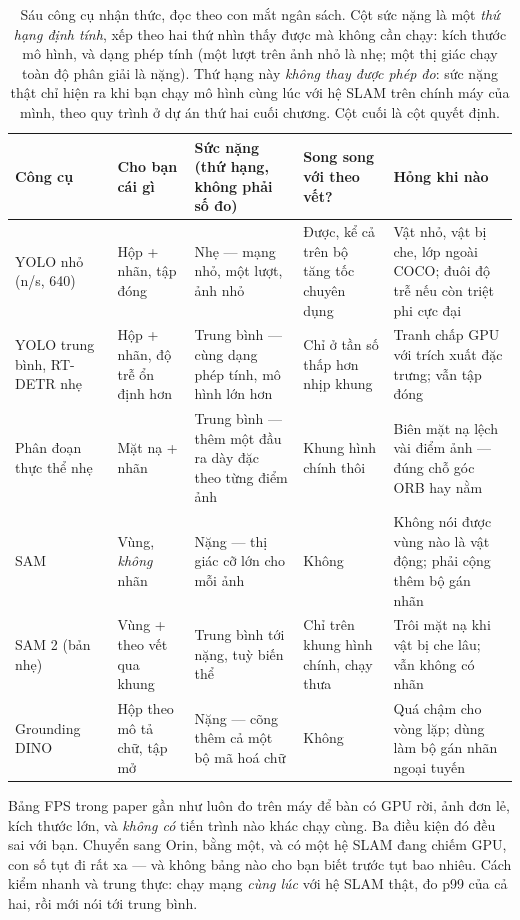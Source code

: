 \documentclass[../../deep_learning.tex]{subfiles}
\begin{document}
\begin{table}[H]\centering\footnotesize
\caption{Sáu công cụ nhận thức, đọc theo con mắt ngân sách. Cột sức nặng là một \emph{thứ hạng định tính}, xếp theo hai thứ nhìn thấy được mà không cần chạy: kích thước mô hình, và dạng phép tính (một lượt trên ảnh nhỏ là nhẹ; một  thị giác chạy toàn độ phân giải là nặng). Thứ hạng này \emph{không thay được phép đo}: sức nặng thật chỉ hiện ra khi bạn chạy mô hình cùng lúc với hệ SLAM trên chính máy của mình, theo quy trình ở dự án thứ hai cuối chương. Cột cuối là cột quyết định.}
\label{tab:f33-cong-cu}
\begin{tabularx}{\linewidth}{@{}L{2.2cm}L{2.6cm}L{3.0cm}L{1.8cm}Y@{}}
\toprule
\textbf{Công cụ} & \textbf{Cho bạn cái gì} & \textbf{Sức nặng (thứ hạng, không phải số đo)} & \textbf{Song song với theo vết?} & \textbf{Hỏng khi nào}\\
\midrule
YOLO nhỏ (n/s, 640) & Hộp + nhãn, tập đóng & Nhẹ --- mạng nhỏ, một lượt, ảnh nhỏ & Được, kể cả trên bộ tăng tốc chuyên dụng & Vật nhỏ, vật bị che, lớp ngoài COCO; đuôi độ trễ nếu còn triệt phi cực đại\\
YOLO trung bình, RT-DETR nhẹ & Hộp + nhãn, độ trễ ổn định hơn & Trung bình --- cùng dạng phép tính, mô hình lớn hơn & Chỉ ở tần số thấp hơn nhịp khung & Tranh chấp GPU với trích xuất đặc trưng; vẫn tập đóng\\
Phân đoạn thực thể nhẹ & Mặt nạ + nhãn & Trung bình --- thêm một đầu ra dày đặc theo từng điểm ảnh & Khung hình chính thôi & Biên mặt nạ lệch vài điểm ảnh --- đúng chỗ góc ORB hay nằm\\
SAM & Vùng, \emph{không} nhãn & Nặng ---  thị giác cỡ lớn cho mỗi ảnh & Không & Không nói được vùng nào là vật động; phải cộng thêm bộ gán nhãn\\
SAM 2 (bản nhẹ) & Vùng + theo vết qua khung & Trung bình tới nặng, tuỳ biến thể & Chỉ trên khung hình chính, chạy thưa & Trôi mặt nạ khi vật bị che lâu; vẫn không có nhãn\\
Grounding DINO & Hộp theo mô tả chữ, tập mở & Nặng --- cõng thêm cả một bộ mã hoá chữ & Không & Quá chậm cho vòng lặp; dùng làm bộ gán nhãn ngoại tuyến\\
\bottomrule
\end{tabularx}
\end{table}

\begin{cambay}
Bảng FPS trong paper gần như luôn đo trên máy để bàn có GPU rời, ảnh đơn lẻ, kích thước  lớn, và \emph{không có} tiến trình nào khác chạy cùng. Ba điều kiện đó đều sai với bạn. Chuyển sang Orin,  bằng một, và có một hệ SLAM đang chiếm GPU, con số tụt đi rất xa --- và không bảng nào cho bạn biết trước tụt bao nhiêu. Cách kiểm nhanh và trung thực: chạy mạng \emph{cùng lúc} với hệ SLAM thật, đo p99 của cả hai, rồi mới nói tới trung bình.
\end{cambay}
\end{document}
